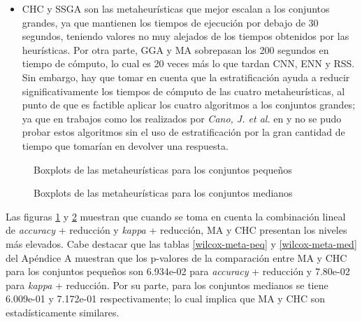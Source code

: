 \begin{itemize}
\item CHC y SSGA son las metaheurísticas que mejor escalan a los conjuntos grandes, ya que mantienen los tiempos de ejecución por debajo de 30 segundos, teniendo valores no muy alejados de los tiempos obtenidos por las heurísticas. Por otra parte, GGA y MA sobrepasan los 200 segundos en tiempo de cómputo, lo cual es 20 veces más lo que tardan CNN, ENN y RSS. Sin embargo, hay que tomar en cuenta que la estratificación ayuda a reducir significativamente los tiempos de cómputo de las cuatro metaheurísticas, al punto de que es factible aplicar los cuatro algoritmos a los conjuntos grandes; ya que en trabajos como los realizados por \emph{Cano, J. et al.} en \cite{garcia2008memetic} y \cite{garcia2012prototype} no se pudo probar estos algoritmos sin el uso de estratificación por la gran cantidad de tiempo que tomarían en devolver una respuesta.

\end{itemize}


\begin{figure}[h!]

	\centering

\caption{Boxplots de las metaheurísticas para los conjuntos pequeños}
\label{small-heuristics}
\end{figure}

\begin{figure}[h!]

	\centering

\caption{Boxplots de las metaheurísticas para los conjuntos medianos}
\label{medium-heuristics}
\end{figure}

Las figuras \ref{small-heuristics} y \ref{medium-heuristics} muestran que cuando se toma en cuenta la combinación lineal de \emph{accuracy} + reducción y \emph{kappa} + reducción, MA y CHC presentan los niveles más elevados. Cabe destacar que las tablas \ref{wilcox-meta-peq} y \ref{wilcox-meta-med} del Apéndice A muestran que los p-valores de la comparación entre MA y CHC para los conjuntos pequeños son 6.934e-02 para \emph{accuracy} + reducción y  7.80e-02 para \emph{kappa} + reducción. Por su parte, para los conjuntos medianos se tiene 6.009e-01 y 7.172e-01 respectivamente; lo cual implica que MA y CHC son estadísticamente similares. 

